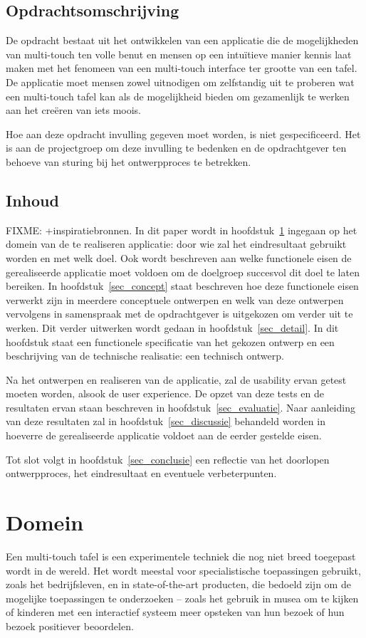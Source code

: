 \documentclass{acm}
\begin{document}
\subsection{Opdrachtsomschrijving}
De opdracht bestaat uit het ontwikkelen van een applicatie die de mogelijkheden van multi-touch ten volle benut en mensen op een intu\"itieve manier kennis laat maken met het fenomeen van een multi-touch interface ter grootte van een tafel. De applicatie moet mensen zowel uitnodigen om zelfstandig uit te proberen wat een multi-touch tafel kan als de mogelijkheid bieden om gezamenlijk te werken aan het cre\"eren van iets moois.

Hoe aan deze opdracht invulling gegeven moet worden, is niet gespecificeerd. Het is aan de projectgroep om deze invulling te bedenken en de opdrachtgever ten behoeve van sturing bij het ontwerpproces te betrekken.

\subsection{Inhoud}
FIXME: +inspiratiebronnen.
In dit paper wordt in hoofdstuk~\ref{sec_domein} ingegaan op het domein van de te realiseren applicatie: door wie zal het eindresultaat gebruikt worden en met welk doel. Ook wordt beschreven aan welke functionele eisen de gerealiseerde applicatie moet voldoen om de doelgroep succesvol dit doel te laten bereiken. In hoofdstuk~\ref{sec_concept} staat beschreven hoe deze functionele eisen verwerkt zijn in meerdere conceptuele ontwerpen en welk van deze ontwerpen vervolgens in samenspraak met de opdrachtgever is uitgekozen om verder uit te werken. Dit verder uitwerken wordt gedaan in hoofdstuk~\ref{sec_detail}. In dit hoofdstuk staat een functionele specificatie van het gekozen ontwerp en een beschrijving van de technische realisatie: een technisch ontwerp.

Na het ontwerpen en realiseren van de applicatie, zal de usability ervan getest moeten worden, alsook de user experience. De opzet van deze tests en de resultaten ervan staan beschreven in hoofdstuk~\ref{sec_evaluatie}. Naar aanleiding van deze resultaten zal in hoofdstuk~\ref{sec_discussie} behandeld worden in hoeverre de gerealiseerde applicatie voldoet aan de eerder gestelde eisen.

Tot slot volgt in hoofdstuk~\ref{sec_conclusie} een reflectie van het doorlopen ontwerpproces, het eindresultaat en eventuele verbeterpunten.

\section{Domein}
\label{sec_domein}
Een multi-touch tafel is een experimentele techniek die nog niet breed toegepast wordt in de wereld. Het wordt meestal voor specialistische toepassingen gebruikt, zoals het bedrijfsleven, en in state-of-the-art producten, die bedoeld zijn om de mogelijke toepassingen te onderzoeken -- zoals het gebruik in musea om te kijken of kinderen met een interactief systeem meer opsteken van hun bezoek of hun bezoek positiever beoordelen.
\end{document}
